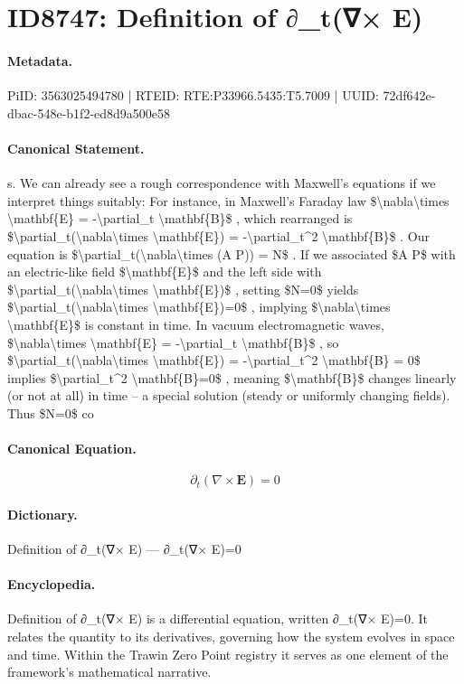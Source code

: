 \section*{ID8747: Definition of ∂\_t(∇× E)}
\paragraph{Metadata.}
PiID: 3563025494780 | RTEID: RTE:P33966.5435:T5.7009 | UUID: 72df642e-dbac-548e-b1f2-ed8d9a500e58

\paragraph{Canonical Statement.}
s. We can already see a rough correspondence with Maxwell’s equations if we interpret things suitably: For instance, in Maxwell’s Faraday law \$\textbackslash{}nabla\textbackslash{}times \textbackslash{}mathbf\{E\} = -\textbackslash{}partial\_t \textbackslash{}mathbf\{B\}\$ , which rearranged is \$\textbackslash{}partial\_t(\textbackslash{}nabla\textbackslash{}times \textbackslash{}mathbf\{E\}) = -\textbackslash{}partial\_t\textasciicircum{}2 \textbackslash{}mathbf\{B\}\$ . Our equation is \$\textbackslash{}partial\_t(\textbackslash{}nabla\textbackslash{}times (A P)) = N\$ . If we associated \$A P\$ with an electric-like field \$\textbackslash{}mathbf\{E\}\$ and the left side with \$\textbackslash{}partial\_t(\textbackslash{}nabla\textbackslash{}times \textbackslash{}mathbf\{E\})\$ , setting \$N=0\$ yields \$\textbackslash{}partial\_t(\textbackslash{}nabla\textbackslash{}times \textbackslash{}mathbf\{E\})=0\$ , implying \$\textbackslash{}nabla\textbackslash{}times \textbackslash{}mathbf\{E\}\$ is constant in time. In vacuum electromagnetic waves, \$\textbackslash{}nabla\textbackslash{}times \textbackslash{}mathbf\{E\} = -\textbackslash{}partial\_t \textbackslash{}mathbf\{B\}\$ , so \$\textbackslash{}partial\_t(\textbackslash{}nabla\textbackslash{}times \textbackslash{}mathbf\{E\}) = -\textbackslash{}partial\_t\textasciicircum{}2 \textbackslash{}mathbf\{B\} = 0\$ implies \$\textbackslash{}partial\_t\textasciicircum{}2 \textbackslash{}mathbf\{B\}=0\$ , meaning \$\textbackslash{}mathbf\{B\}\$ changes linearly (or not at all) in time – a special solution (steady or uniformly changing fields). Thus \$N=0\$ co

\paragraph{Canonical Equation.}
\[
\partial_t(\nabla\times \mathbf{E})=0
\]

\paragraph{Dictionary.}
Definition of ∂\_t(∇× E) — ∂\_t(∇× E)=0

\paragraph{Encyclopedia.}
Definition of ∂\_t(∇× E) is a differential equation, written ∂\_t(∇× E)=0. It relates the quantity to its derivatives, governing how the system evolves in space and time. Within the Trawin Zero Point registry it serves as one element of the framework's mathematical narrative.
